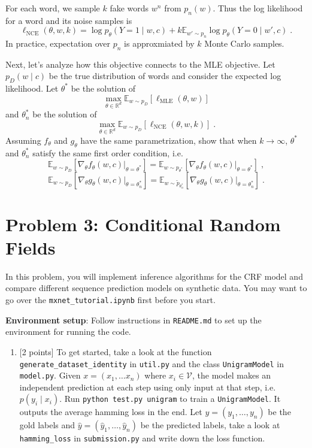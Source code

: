 \documentclass{article}
\theoremstyle{case}
\theoremstyle{definition}
\begin{document}
\begin{enumerate}
        For each word, we sample $k$ fake words $w^n$ from $p_n(w)$.
        Thus the log likelihood for a word and its noise samples is 
        $$
        \ell_{\text{NCE}}(\theta, w, k) =
            \log p_\theta(Y=1\mid w, c) + k\mathbb{E}_{w'\sim p_n} \log p_\theta(Y=0\mid w', c)
    \;.
        $$
        In practice, expectation over $p_n$ is approxmiated by $k$ Monte Carlo samples.

        Next, let's analyze how this objective connects to the MLE objective.
        Let $p_D(w\mid c)$ be the true distribution of words
        and consider the expected log likelihood.
        Let $\theta^*$ be the solution of
        $$
        \max_{\theta\in \mathbb{R}^d} 
\mathbb{E}_{w\sim p_D} \left [\ell_{\text{MLE}}(\theta, w)
        \right ]
        $$
        and $\theta^*_n$ be the solution of
        $$
        \max_{\theta\in \mathbb{R}^d} 
\mathbb{E}_{w\sim p_D} \left [ \ell_{\text{NCE}}(\theta, w,k)
        \right ]
        \;.
        $$
        Assuming $f_\theta$ and $g_\theta$ have the same parametrization,
        show that when $k\rightarrow\infty$,
        $\theta^*$ and $\theta^*_n$ satisfy the same first order condition, i.e.
        $$
        \mathbb{E}_{w\sim p_D}\left[ \nabla_{\theta} f_{\theta}(w, c)|_{\theta=\theta^*} \right ]
        = \mathbb{E}_{w\sim p_{\theta^*}} \left[ \nabla_{\theta} f_{\theta}(w, c) |_{\theta=\theta^*}\right ]
        \;,
        $$
        $$
        \mathbb{E}_{w\sim p_D}\left[ \nabla_{\theta} g_{\theta}(w, c)|_{\theta=\theta_n^*} \right ]
        = \mathbb{E}_{w\sim \tilde{p}_{\theta_n^*}} \left[ \nabla_{\theta} g_{\theta}(w, c) |_{\theta=\theta_n^*}\right ]
        \;.
        $$


    \newpage
    \section*{Problem 3: Conditional Random Fields}
    In this problem, you will implement inference algorithms for the CRF model and compare different sequence prediction models on synthetic data. 
    You may want to go over the \texttt{mxnet\_tutorial.ipynb} first before you start.

    \textbf{Environment setup}: Follow instructions in \texttt{README.md} to set up the environment for running the code.
    \begin{enumerate}
        \item {[2 points]} To get started, take a look at the function \texttt{generate\_dataset\_identity} in \texttt{util.py}  
            and the class \texttt{UnigramModel} in \texttt{model.py}.
            Given $x=(x_1, \ldots x_n)$ where $x_i\in\mathcal{V}$,
            the model makes an independent prediction at each step using only input at that step, i.e. $p(y_i\mid x_i)$.
            Run \texttt{python test.py unigram} to train a \texttt{UnigramModel}.
            It outputs the average hamming loss in the end.
            Let $y=(y_1, \ldots, y_n)$ be the gold labels and 
            $\hat{y} = (\hat{y}_1, \ldots, \hat{y}_n)$ be the predicted labels,
            take a look at \texttt{hamming\_loss} in \texttt{submission.py}
            and write down the loss function.



\end{enumerate}
\end{enumerate}
\end{document}
